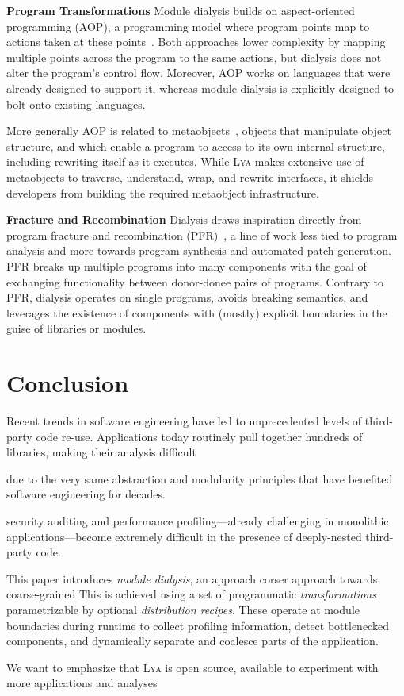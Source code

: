 \documentclass[letterpaper,twocolumn,10pt]{article}
\newcommand{\heading}[1]{\vspace{2pt}\noindent\textbf{#1}\enspace}
\newcommand{\sys}{{\scshape Lya}\xspace}
\begin{document}
\heading{Program Transformations}
Module dialysis builds on aspect-oriented programming (AOP), a programming model where program points map to actions taken at these points~\cite{aop}.
Both approaches lower complexity by mapping multiple points across the program to the same actions, but dialysis does not alter the program's control flow.
Moreover, AOP works on languages that were already designed to support it, whereas module dialysis is explicitly designed to bolt onto existing languages.

More generally AOP is related to metaobjects~\cite{metaobject}, objects that manipulate object structure, and which enable a program to access to its own internal structure, including rewriting itself as it executes.
While \sys makes extensive use of metaobjects to traverse, understand, wrap, and rewrite interfaces, it shields developers from building the required metaobject infrastructure.

\heading{Fracture and Recombination}
Dialysis draws inspiration directly from program fracture and recombination (PFR)~\cite{fracture1, fracture3}, a line of work less tied to program analysis and more towards program synthesis and automated patch generation.
PFR breaks up multiple programs into many components with the goal of exchanging functionality between donor-donee pairs of programs.
Contrary to PFR, dialysis operates on single programs, avoids breaking semantics, and leverages the existence of components with (mostly) explicit boundaries in the guise of libraries or modules.

\section{Conclusion}
\label{end}

Recent trends in software engineering have led to unprecedented levels of third-party code re-use.
Applications today routinely pull together hundreds of libraries, making their analysis difficult 

due to the very same abstraction and modularity principles that have benefited software engineering for decades.

security auditing and performance profiling---already challenging in monolithic applications---become extremely difficult in the presence of deeply-nested third-party code.

This paper introduces \emph{module dialysis}, an approach 
corser
approach towards coarse-grained
This is achieved using a set of programmatic \emph{transformations} parametrizable by optional \emph{distribution recipes}.
These operate at module boundaries during runtime to collect profiling information, detect bottlenecked components, and dynamically separate and coalesce parts of the application.

We want to emphasize that \sys is open source, available to experiment with more applications and analyses




\end{document}
